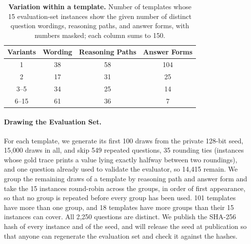 \begin{table}[t]
    \centering
    \small
    \setlength{\tabcolsep}{6pt}
    \begin{tabular}{c|ccc}
        \toprule
        \rowcolor{gray!10}
        \textbf{Variants} & \textbf{Wording} & \textbf{Reasoning Paths} & \textbf{Answer Forms} \\
        \midrule
        1 & 38 & 58 & 104 \\
        2 & 17 & 31 & 25 \\
        3--5 & 34 & 25 & 14 \\
        6--15 & 61 & 36 & 7 \\
        \bottomrule
    \end{tabular}
    \caption{\textbf{Variation within a template.} Number of templates whose 15 evaluation-set
    instances show the given number of distinct question wordings, reasoning paths, and answer
    forms, with numbers masked; each column sums to 150.}
    \label{tab:template_variation}
\end{table}

\paragraph{Drawing the Evaluation Set.}
For each template, we generate its first 100 draws from the private 128-bit seed, 15,000 draws in
all, and skip 549 repeated questions, 35 rounding ties (instances whose gold trace prints a value
lying exactly halfway between two roundings), and one question already used to validate the
evaluator, so 14,415 remain.
We group the remaining draws of a template by reasoning path and answer form and take the 15
instances round-robin across the groups, in order of first appearance, so that no group is repeated
before every group has been used.
101 templates have more than one group, and 18 templates have more groups than their 15 instances
can cover.
All 2,250 questions are distinct.
We publish the SHA-256 hash of every instance and of the seed, and will release the seed at
publication so that anyone can regenerate the evaluation set and check it against the hashes.
